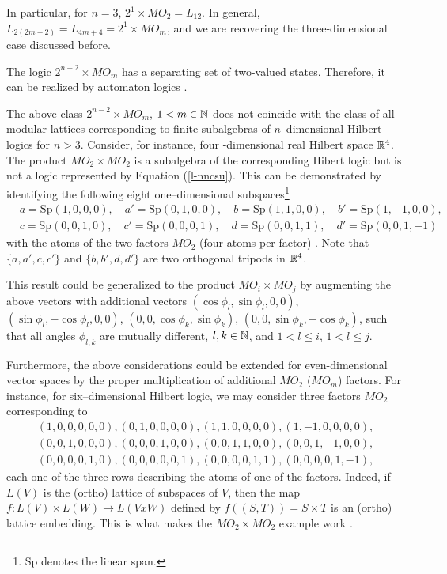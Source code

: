 \documentclass[%
  preprint,
 showpacs,
 showkeys,
 preprintnumbers,
 amsmath,amssymb,
 aps,
 rmp,
  longbibliography,
 ]{revtex4-1}
\def\sp{\textrm{Sp}}
\begin{document}
In particular, for $n=3$,
$2^1\times MO_2=L_{12}$.
 In general, $L_{2(2m+2)}=L_{4m+4}=2^1\times MO_m$,
and we are recovering the three-dimensional case discussed before.



The logic $2^{n-2}\times MO_m$ has a
separating set of two-valued states. Therefore, it can be realized by
automaton logics \cite{svozil-93}.


The above class
$2^{n-2}\times MO_m$, $1<m\in {\Bbb N}$ does not coincide with
the class of all modular lattices
corresponding to finite subalgebras of $n$--dimensional Hilbert logics
for $n>3$. Consider, for instance,
four
-dimensional real Hilbert space
${\Bbb R}^4$.
The product $MO_2\times MO_2$ is a subalgebra of the corresponding
Hibert logic but is not a logic represented by Equation
(\ref{l-nncsu}).
This can be demonstrated by identifying the following
eight
one--dimensional subspaces\footnote{
$\sp$ denotes the linear span.}
\begin{eqnarray*}
&a=\sp (1,0,0,0),\quad
a'=\sp (0,1,0,0),\quad
b=\sp (1,1,0,0),\quad
b'=\sp (1,-1,0,0),&\\
&c=\sp (0,0,1,0),\quad
c'=\sp (0,0,0,1),\quad
d=\sp (0,0,1,1),\quad
d'=\sp (0,0,1,-1)&
\end{eqnarray*}
 with the atoms
of the two factors $MO_2$ (four
atoms per factor) \cite{harding-priv}.
Note that $\{a,a',c,c'\}$ and $\{b,b',d,d'\}$ are two
orthogonal tripods in ${\Bbb R}^4$.

This result could be generalized to the product $MO_i \times MO_j$ by
augmenting the above vectors with additional vectors
$(\cos \phi_l,\sin \phi_l,0,0)$,
$(\sin \phi_l,-\cos \phi_l,0,0)$,
$(0,0,\cos \phi_k,\sin \phi_k)$,
$(0,0,\sin \phi_k,-\cos \phi_k)$, such that all angles $\phi_{l,k}$ are
mutually different,
$l,k\in {\Bbb N}$, and
$1<l \le i$,
$1<l \le j$.

Furthermore,
the above considerations could be extended
for even-dimensional vector spaces by the proper multiplication of
additional $MO_2$ ($MO_m$) factors. For instance, for six--dimensional
Hilbert logic, we may consider three factors $MO_2$ corresponding to
\begin{eqnarray*}
& (1,0,0,0,0,0),
(0,1,0,0,0,0),
(1,1,0,0,0,0),
 (1,-1,0,0,0,0),&\\
& (0,0,1,0,0,0),
(0,0,0,1,0,0),
(0,0,1,1,0,0),
(0,0,1,-1,0,0),&\\
& (0,0,0,0,1,0),
(0,0,0,0,0,1),
(0,0,0,0,1,1),
(0,0,0,0,1,-1),
\end{eqnarray*}
each one of the three rows describing the atoms of one of the factors.
Indeed,
if $L(V)$ is the
(ortho) lattice of subspaces of $V$, then
the map $f:L(V) \times L(W) \rightarrow L(V x W)$ defined by
$f((S,T)) = S \times T$ is an (ortho) lattice embedding. This is what
makes the $MO_2 \times MO_2$ example work \cite{harding-priv}.
\end{document}
